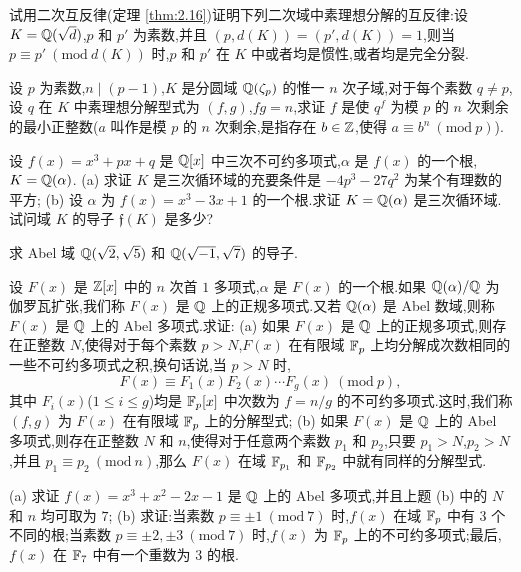 \begin{Exercises}
  \item 试用二次互反律(定理 \ref{thm:2.16})证明下列二次域中素理想分解的互反律:设 $K=\mathbb{Q}(\sqrt{d})$,$p$ 和 $p'$ 为素数,并且 $(p,d(K))=(p',d(K))=1$,则当 $p\equiv p'\ (\mathrm{mod}\ d(K))$ 时,$p$ 和 $p'$ 在 $K$ 中或者均是惯性,或者均是完全分裂.
  \item 设 $p$ 为素数,$n\mid(p-1)$,$K$ 是分圆域 $\mathbb{Q}(\zeta_p)$ 的惟一 $n$ 次子域,对于每个素数 $q\neq p$,设 $q$ 在 $K$ 中素理想分解型式为 $(f,g)$,$fg=n$,求证 $f$ 是使 $q^f$ 为模 $p$ 的 $n$ 次剩余的最小正整数($a$ 叫作是模 $p$ 的 $n$ 次剩余,是指存在 $b\in\mathbb{Z}$,使得 $a\equiv b^n\ (\mathrm{mod}\ p)$).
  \item 设 $f(x)=x^3+px+q$ 是 $\mathbb{Q}[x]$ 中三次不可约多项式,$\alpha$ 是 $f(x)$ 的一个根,$K=\mathbb{Q}(\alpha)$.
        (a) 求证 $K$ 是三次循环域的充要条件是 $-4p^3-27q^2$ 为某个有理数的平方;
        (b) 设 $\alpha$ 为 $f(x)=x^3-3x+1$ 的一个根.求证 $K=\mathbb{Q}(\alpha)$ 是三次循环域.试问域 $K$ 的导子 $\mathfrak{f}(K)$ 是多少?
  \item 求 Abel 域 $\mathbb{Q}(\sqrt{2},\sqrt{5})$ 和 $\mathbb{Q}(\sqrt{-1},\sqrt{7})$ 的导子.
  \item 设 $F(x)$ 是 $\mathbb{Z}[x]$ 中的 $n$ 次首 $1$ 多项式,$\alpha$ 是 $F(x)$ 的一个根.如果 $\mathbb{Q}(\alpha)/\mathbb{Q}$ 为伽罗瓦扩张,我们称 $F(x)$ 是 $\mathbb{Q}$ 上的正规多项式.又若 $\mathbb{Q}(\alpha)$ 是 Abel 数域,则称 $F(x)$ 是 $\mathbb{Q}$ 上的 Abel 多项式.求证:
        (a) 如果 $F(x)$ 是 $\mathbb{Q}$ 上的正规多项式,则存在正整数 $N$,使得对于每个素数 $p>N$,$F(x)$ 在有限域 $\mathbb{F}_p$ 上均分解成次数相同的一些不可约多项式之积,换句话说,当 $p>N$ 时,
        \[
          F(x)\equiv F_1(x)F_2(x)\cdots F_g(x)\ (\mathrm{mod}\ p),
        \]
        其中 $F_i(x)$($1\leqslant i\leqslant g$)均是 $\mathbb{F}_p[x]$ 中次数为 $f=n/g$ 的不可约多项式.这时,我们称 $(f,g)$ 为 $F(x)$ 在有限域 $\mathbb{F}_p$ 上的分解型式;
        (b) 如果 $F(x)$ 是 $\mathbb{Q}$ 上的 Abel 多项式,则存在正整数 $N$ 和 $n$,使得对于任意两个素数 $p_1$ 和 $p_2$,只要 $p_1>N$,$p_2>N$,并且 $p_1\equiv p_2\ (\mathrm{mod}\ n)$,那么 $F(x)$ 在域 $\mathbb{F}_{p_1}$ 和 $\mathbb{F}_{p_2}$ 中就有同样的分解型式.
  \item (a) 求证 $f(x)=x^3+x^2-2x-1$ 是 $\mathbb{Q}$ 上的 Abel 多项式,并且上题 (b) 中的 $N$ 和 $n$ 均可取为 $7$;
        (b) 求证:当素数 $p\equiv\pm 1\ (\mathrm{mod}\ 7)$ 时,$f(x)$ 在域 $\mathbb{F}_p$ 中有 $3$ 个不同的根;当素数 $p\equiv\pm 2,\pm 3\ (\mathrm{mod}\ 7)$ 时,$f(x)$ 为 $\mathbb{F}_p$ 上的不可约多项式;最后,$f(x)$ 在 $\mathbb{F}_7$ 中有一个重数为 $3$ 的根.
\end{Exercises}
